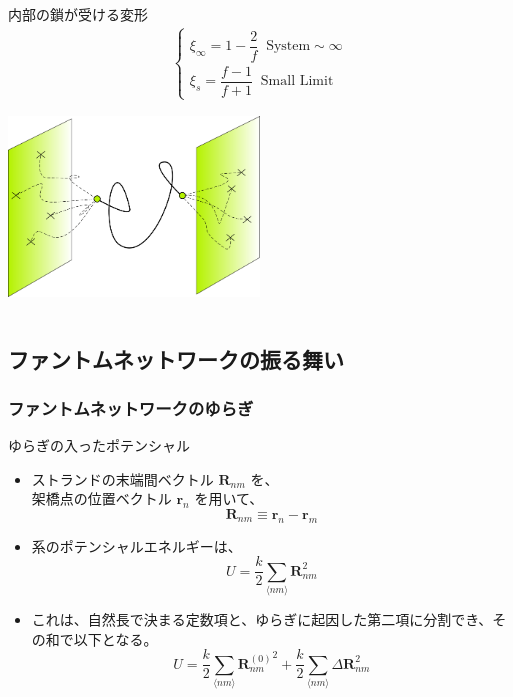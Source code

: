 \documentclass[12pt, dvipdfmx]{beamer}
\begin{document}
\begin{frame}
\begin{columns}[totalwidth=1\textwidth]
\begin{exampleblock}{内部の鎖が受ける変形}
\begin{align*}
\begin{cases}
							\xi_{\infty} = 1-\dfrac{2}{f} \;\; \text{System}\sim \infty \\[8pt]
							\xi_{s} = \dfrac{f-1}{f+1} \;\; \text{Small Limit}
							\end{cases}
					\end{align*}
					\vspace{-3mm}
					\begin{center}
						\includegraphics[width=0.5\textwidth]{phantom.png}
					\end{center}
				\end{exampleblock}
		\end{columns}
\end{frame}

\subsection{ファントムネットワークの振る舞い}
\begin{frame}
	\frametitle{ファントムネットワークのゆらぎ}
		\begin{block}{ゆらぎの入ったポテンシャル}
			\begin{itemize}
				\item ストランドの末端間ベクトル $\bm{R}_{nm}$ を、\\架橋点の位置ベクトル $\bm{r}_n$ を用いて、
					\footnotesize
					\begin{equation*}
						\bm{R}_{nm} \equiv \bm{r}_n-\bm{r}_m
					\end{equation*}
					\normalsize
				\item 系のポテンシャルエネルギーは、
					\footnotesize
					\begin{equation*}
						U=\dfrac{k}{2} \sum_{\langle nm \rangle} \bm{R}_{nm}^2
					\end{equation*}
					\normalsize
				\item これは、自然長で決まる定数項と、ゆらぎに起因した第二項に分割でき、その和で以下となる。
					\footnotesize
					\begin{equation*}
						U=\dfrac{k}{2} \sum_{\langle nm \rangle} {\bm{R}_{nm}^{(0)}}^2 + \dfrac{k}{2} \sum_{\langle nm \rangle} \Delta \bm{R}_{nm}^2
					\end{equation*}
					\normalsize
			\end{itemize}
		\end{block}
\end{frame}
\end{document}
